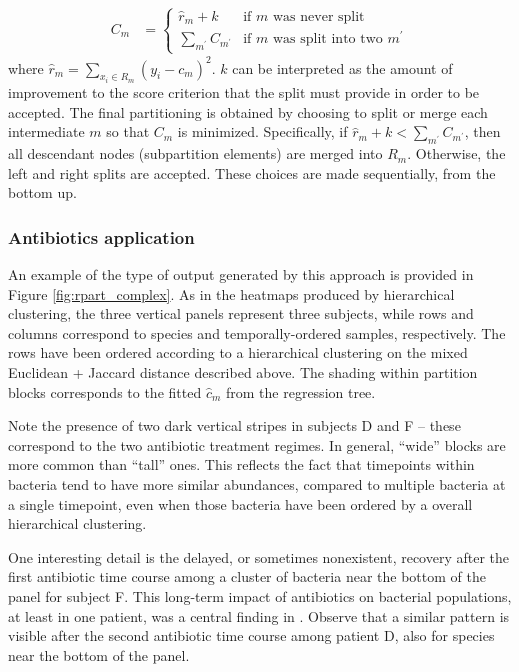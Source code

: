 \documentclass{article}
\begin{document}
\begin{align}
  C_{m} &= \begin{cases}
    \hat{r}_{m} + k & \text{if $m$ was never split} \\
    \sum_{m^\prime} C_{m^{\prime}} & \text{if $m$ was split into two $m^{\prime}$}
    \end{cases}
\end{align}
where $\hat{r}_{m} = \sum_{x_{i} \in R_{m}} \left(y_{i} - c_{m}\right)^{2}$. $k$
can be interpreted as the amount of improvement to the score criterion that the
split must provide in order to be accepted. The
final partitioning is obtained by choosing to split or merge each intermediate
$m$ so that $C_{m}$ is minimized. Specifically, if
$\hat{r}_{m} + k < \sum_{m^{\prime}} C_{m^{\prime}}$, then all descendant nodes
(subpartition elements) are merged into $R_{m}$. Otherwise, the left and right
splits are accepted. These choices are made sequentially, from the bottom up.

\subsubsection{Antibiotics application}
\label{subsubsec:antibiotics_application}

An example of the type of output generated by this approach is provided in
Figure \ref{fig:rpart_complex}. As in the heatmaps produced by hierarchical
clustering, the three vertical panels represent three subjects, while rows and
columns correspond to species and temporally-ordered samples, respectively. The
rows have been ordered according to a hierarchical clustering on the mixed
Euclidean + Jaccard distance described above. The shading within partition
blocks corresponds to the fitted $\hat{c}_{m}$ from the regression tree.

Note the presence of two dark vertical stripes in subjects D and F -- these
correspond to the two antibiotic treatment regimes. In general, ``wide'' blocks
are more common than ``tall'' ones. This reflects the fact that timepoints
within bacteria tend to have more similar abundances, compared to multiple
bacteria at a single timepoint, even when those bacteria have been ordered by a
overall hierarchical clustering.

One interesting detail is the delayed, or sometimes nonexistent, recovery after
the first antibiotic time course among a cluster of bacteria near the bottom of
the panel for subject F. This long-term impact of antibiotics on bacterial
populations, at least in one patient, was a central finding in
\citep{dethlefsen2011complete}. Observe that a similar pattern is visible after
the second antibiotic time course among patient D, also for species near the
bottom of the panel.
\end{document}

